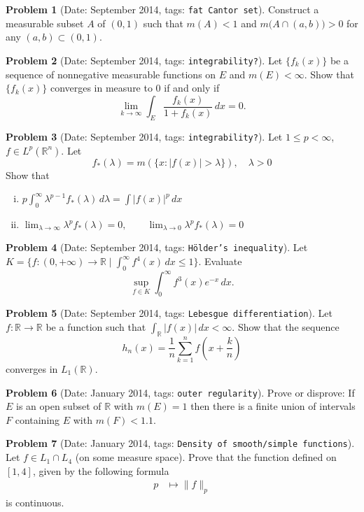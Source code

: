 \documentclass[11pt, notitlepage]{article}
\theoremstyle{definition}
\theoremstyle{definition}
\theoremstyle{definition}
\newtheorem{probstate}{Problem}
\theoremstyle{remark}
\newenvironment{problem}[2]{
    \begin{probstate}[Date: #1, tags: \texttt{#2}]
}
{
  \end{probstate}
}
\newcommand{\R}{\mathbb{R}}
\begin{document}
\begin{problem}{September 2014}{fat Cantor set}
Construct a measurable subset $A$ of $(0,1)$ such that $m(A)<1$ and 
 $m \big(A \cap (a,b) \big) >0$ for any $(a,b) \subset (0,1)$.
\end{problem}

\begin{problem}{September 2014}{integrability?}
Let $\{f_k(x)\}$ be a sequence of nonnegative measurable functions on $E$ and $m(E)<\infty$. Show that $\{f_k(x)\}$ converges in measure to $0$ if and only if 
$$\lim_{k\to\infty}\int_E\frac{f_k(x)}{1+f_k(x)}\,dx=0.$$
\end{problem}

\begin{problem}{September 2014}{integrability?}
Let $1\le p<\infty$, $f\in L^p(\mathbb R^n)$. Let
$$f_*(\lambda)=m(\{x: |f(x)|>\lambda\}), \quad \lambda>0$$
Show that 

\begin{enumerate}[(i)]
\item$p\int_0^\infty \lambda^{p-1} f_*(\lambda)\,d\lambda= \int |f(x)|^p\,dx$
\item  $\lim_{\lambda\to\infty}\lambda^p f_*(\lambda)=0,\qquad \lim_{\lambda\to 0}\lambda^p f_*(\lambda)=0$
\end{enumerate}
\end{problem}

\begin{problem}{September 2014}{H\"older's inequality}
Let $K=\{f :(0,+\infty) \to \R \mid \int_0^{\infty} f^4(x) \, dx \le 1  \}$. Evaluate
\[
  \sup_{f \in K} \int_0^\infty f^3(x) e^{-x}  \, dx.
\]
\end{problem}

\begin{problem}{September 2014}{Lebesgue differentiation}
Let  $f: \R \to \R$ be a function such that $\int_{\R} |f(x)| \, dx < \infty$. Show that the sequence
\[
 h_n(x)=\frac{1}{n} \sum_{k=1}^n f \left(x+ \frac{k}{n} \right)
\]
converges in $L_1(\R)$.
\end{problem}

\begin{problem}{January 2014}{outer regularity}
Prove or disprove:  If $E$ is an open subset of $\R$ with $m(E)=1$ then there is a finite union of intervals $F$ containing $E$ with $m(F)<1.1$.
\end{problem}

\begin{problem}{January 2014}{Density of smooth/simple functions}
Let $f\in L_1\cap L_4$ (on some measure space).  Prove that the function defined on $[1,4]$, given by the following formula
\begin{align*}
p & \mapsto \|f\|_p
\end{align*}
 is continuous.
\end{problem}
\end{document}

